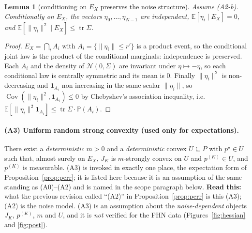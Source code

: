\documentclass[11pt]{article}
\newtheorem{lemma}{Lemma}
\theoremstyle{remark}\newtheorem{remark}{Remark}
\newcommand{\pstar}{p^\star}
\newcommand{\norm}[1]{\lVert #1\rVert}
\newcommand{\readthis}[1]{\textbf{Read this:} #1}
\begin{document}
\begin{lemma}[conditioning on $E_X$ preserves the noise structure]\label{lem:trunc}
Assume (A2-b). Conditionally on $E_X$, the vectors $\eta_0,\dots,\eta_{N-1}$ are independent, $\mathbb E[\eta_i\mid E_X]=0$, and $\mathbb E[\norm{\eta_i}^2\mid E_X]\le\operatorname{tr}\Sigma$.
\end{lemma}
\begin{proof}
$E_X=\bigcap_i A_i$ with $A_i=\{\norm{\eta_i}\le r'\}$ is a product event, so the conditional joint law is the product of the conditional marginals: independence is preserved. Each $A_i$ and the density of $\mathcal N(0,\Sigma)$ are invariant under $\eta\mapsto-\eta$, so each conditional law is centrally symmetric and its mean is $0$. Finally $\norm{\eta_i}^2$ is non-decreasing and $\mathbf 1_{A_i}$ non-increasing in the same scalar $\norm{\eta_i}$, so $\operatorname{Cov}(\norm{\eta_i}^2,\mathbf 1_{A_i})\le0$ by Chebyshev's association inequality, i.e.\ $\mathbb E[\norm{\eta_i}^2\mathbf 1_{A_i}]\le\operatorname{tr}\Sigma\cdot\mathbb P(A_i)$.
\end{proof}

\paragraph{(A3) Uniform random strong convexity (used only for expectations).}
There exist a \emph{deterministic} $m>0$ and a \emph{deterministic} convex $U\subseteq P$ with $\pstar\in U$ such that, almost surely on $E_X$, $J_K$ is $m$-strongly convex on $U$ and $p^{(K)}\in U$, and $p^{(K)}$ is measurable. (A3) is invoked in exactly one place, the expectation form of Proposition~\ref{prop:perr}; it is listed here because it is an assumption of the same standing as (A0)--(A2) and is named in the scope paragraph below. \readthis{what the previous revision called ``(A2)'' in Proposition~\ref{prop:perr} is this (A3); (A2) is the noise model. (A3) is an assumption about the \emph{noise-dependent} objects $J_K$, $p^{(K)}$, $m$ and $U$, and it is \emph{not} verified for the FHN data (Figures~\ref{fig:hessian} and \ref{fig:post}).}
\end{document}

